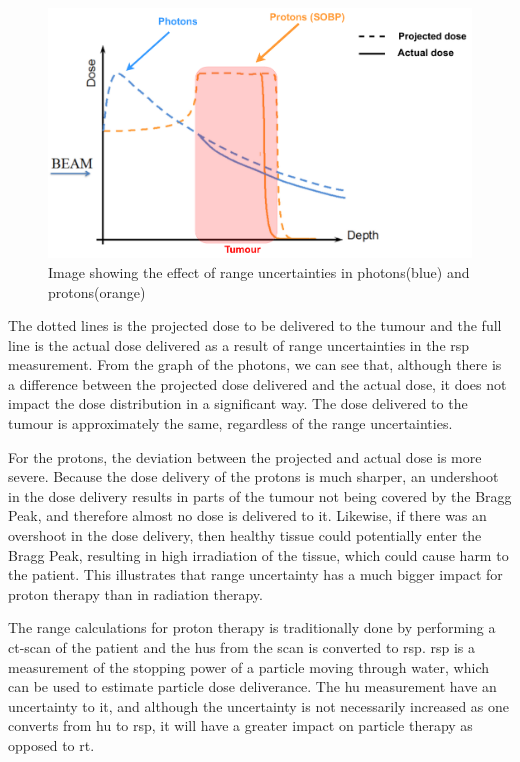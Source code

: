 \documentclass[main.tex]{subfiles}
\begin{document}
\begin{figure}[!htpb]
    \centering
    \includegraphics[width=12cm ]{images/projected_dose_graph.pdf}
    \caption{Image showing the effect of range uncertainties in photons(blue) and protons(orange)\cite{proton_challenges}}
    \label{fig: proton_uncertainty}
\end{figure}
\FloatBarrier


 The dotted lines is the projected dose to be delivered to the tumour and the full line is the actual dose delivered as a result of range uncertainties in the \gls{rsp} measurement. From the graph of the photons, we can see that, although there is a difference between the projected dose delivered and the actual dose, it does not impact the dose distribution in a significant way. The dose delivered to the tumour is approximately the same, regardless of the range uncertainties.
 
 For the protons, the deviation between the projected and actual dose is more severe. Because the dose delivery of the protons is much sharper, an undershoot in the dose delivery results in parts of the tumour not being covered by the Bragg Peak, and therefore almost no dose is delivered to it. Likewise, if there was an overshoot in the dose delivery, then healthy tissue could potentially enter the Bragg Peak, resulting in high irradiation of the tissue, which could cause harm to the patient. This illustrates that range uncertainty has a much bigger impact for proton therapy than in radiation therapy.

The range calculations for proton therapy is traditionally done by performing a \gls{ct}-scan of the patient and the \acrlong{hu}s from the scan is converted to \acrlong{rsp}. \gls{rsp} is a measurement of the stopping power of a particle moving through water, which can be used to estimate particle dose deliverance. The \gls{hu} measurement have an uncertainty to it, and although the uncertainty is not necessarily increased as one converts from \gls{hu} to \gls{rsp}, it will have a greater impact on particle therapy as opposed to \gls{rt}\cite{proton_challenges}.
\end{document}
